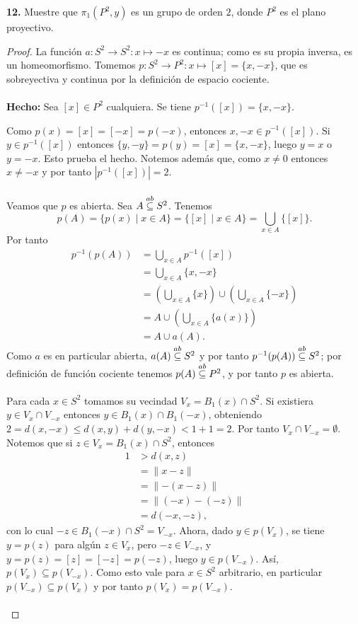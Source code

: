 \textbf{12.} Muestre que $\pi_1(P^2,y)$ es un grupo de orden $2$, donde $P^2$ es el plano proyectivo.
\begin{proof}
La función $a:S^2\to S^2:x\mapsto-x$ es continua; como es su propia inversa, es un homeomorfismo. Tomemos $p:S^2\to P^2:x\mapsto[x]=\{x,-x\}$, que es sobreyectiva y continua por la definición de espacio cociente.\\\\
\textbf{Hecho:} Sea $[x]\in P^2$ cualquiera. Se tiene $p^{-1}([x])=\{x,-x\}$.

Como $p(x)=[x]=[-x]=p(-x)$, entonces $x,-x\in p^{-1}([x])$. Si $y\in p^{-1}([x])$ entonces $\{y,-y\}=p(y)=[x]=\{x,-x\}$, luego $y=x$ o $y=-x$. Esto prueba el hecho. Notemos además que, como $x\ne 0$ entonces $x\ne -x$ y por tanto $|p^{-1}\left( [x]\right)|=2$.\\\\
Veamos que $p$ es abierta. Sea $A\stackrel{ab}{\subseteq} S^2$. Tenemos
\[
p(A)=\{p(x)\mid x\in A\}=\{[x]\mid x\in A\}=\bigcup_{x\in A}\{[x]\}.
\]
Por tanto
\begin{align*}
p^{-1}(p(A))&=\bigcup_{x\in A}p^{-1}([x])\\
&=\bigcup_{x\in A}\{x,-x\}\\
&=\left(\bigcup_{x\in A}\{x\}\right)\cup\left(\bigcup_{x\in A}\{-x\}\right)\\
&=A\cup\left(\bigcup_{x\in A}\{a(x)\}\right)\\
&=A\cup a(A).
\end{align*}
Como $a$ es en particular abierta, $a(A)\stackrel{ab}{\subseteq} S^2$ y por tanto $p^{-1}(p(A))\stackrel{ab}{\subseteq} S^2$; por definición de función cociente tenemos $p(A)\stackrel{ab}{\subseteq} P^2$, y por tanto $p$ es abierta.\\\\
Para cada $x\in S^2$ tomamos su vecindad $V_x=B_1(x)\cap S^2$. Si existiera $y\in V_x\cap V_{-x}$ entonces $y\in B_1(x)\cap B_1(-x)$, obteniendo $2=d(x,-x)\le d(x,y)+d(y,-x)<1+1=2$. Por tanto $V_x\cap V_{-x}=\emptyset$. Notemos que si $z\in V_x=B_1(x)\cap S^2$, entonces
\begin{align*}
1&>d(x,z)\\
&=\lVert x-z\rVert\\
&=\lVert-(x-z)\rVert\\
&=\lVert(-x)-(-z)\rVert\\
&=d(-x,-z),
\end{align*}
con lo cual $-z\in B_1(-x)\cap S^2=V_{-x}$. Ahora, dado $y\in p(V_x)$, se tiene $y=p(z)$ para algún $z\in V_x$, pero $-z\in V_{-x}$, y $y=p(z)=[z]=[-z]=p(-z)$, luego $y\in p(V_{-x})$. Así, $p(V_x)\subseteq p(V_{-x})$. Como esto vale para $x\in S^2$ arbitrario, en particular $p(V_{-x})\subseteq p(V_x)$ y por tanto $p(V_x)=p(V_{-x})$.\\\\

\end{proof}
